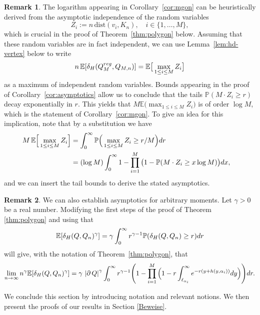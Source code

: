 \documentclass[a4paper,12pt]{article}
\theoremstyle{definition}
\newtheorem{remark}{Remark}
\newcommand{\IE}{\mathbb{E}}
\newcommand{\IP}{\mathbb{P}}
\newcommand{\dd}{{\rm d}}
\newcommand{\dist}{\mathrm{dist}}
\begin{document}
\begin{remark}
	The logarithm appearing in Corollary~\ref{cor:mgon} can be heuristically derived from the asymptotic independence of the random variables
\[
Z_i:=n\, \dist(v_i,K_n),\quad i\in\{1,\dots,M\},
\]
which is crucial in the proof of Theorem~\ref{thm:polygon} below. Assuming that these random variables are in fact independent, we can use Lemma~\ref{lem:hd-vertex} below to write
\[
n\,\IE[ \delta_H(Q_M^{\rm reg},Q_{M,n})]
=\IE \big[\max_{1\le i\le M} Z_i\big]
\]%
as a maximum of independent random variables. Bounds appearing in the proof of Corollary~\ref{cor:asymptotics} allow us to conclude that the tails $\IP(M\cdot Z_i\ge r)$ decay exponentially in $r$. This yields that $M\IE\big( \max_{1\le i\le M}Z_i\big)$ is of order $\log M$, which is the statement of Corollary~\ref{cor:mgon}. To give an idea for this implication, note that by a substitution we have
\begin{align*}
M\, \IE \Big[\max_{1\le i\le M}Z_i\Big]
& =\int_0^{\infty}\IP\Big(\max_{1\le i\le M}Z_i\ge r/M\Big)\dd r \cr
& =(\log M)\int_0^{\infty}1-\prod_{i=1}^M\big(1-\IP(M\cdot Z_i\ge x\log M)\big)\dd x,
\end{align*}
and we can insert the tail bounds to derive the stated asymptotics.
\end{remark}
\vskip 3mm
\begin{remark}
	We can also establish asymptotics for arbitrary moments. Let  $\gamma>0$ be a real  number.  Modifying the first steps of the proof of Theorem \ref{thm:polygon} and using that 
	\[
	\IE[\delta_H(Q,Q_n)^{\gamma}]
	=\gamma \int_0^{\infty}r^{\gamma-1}\IP(\delta_H(Q,Q_n)\ge r)\dd r
	\]
	will give, with the notation of Theorem~\ref{thm:polygon}, that
	\[
	\lim_{n\to\infty}n^{\gamma}\IE[\delta_H(Q,Q_n)^{\gamma}]
	= \gamma \,  \left|\partial \, Q\right|^{\gamma}\int_{0}^{\infty}r^{\gamma-1}\Bigg(1-\prod_{i=1}^M\Big(1-r\int_{\ell_{\alpha_i}}^{\infty}e^{-r(y+h(y,\alpha_i))}\dd y\Big)\Bigg)\dd r.
	\]
\end{remark}

\vskip 4mm


\noindent
We conclude this section by introducing  notation and relevant notions. 
We then present the proofs of our results in Section \ref{Beweise}.

	
\medskip
\end{document}

